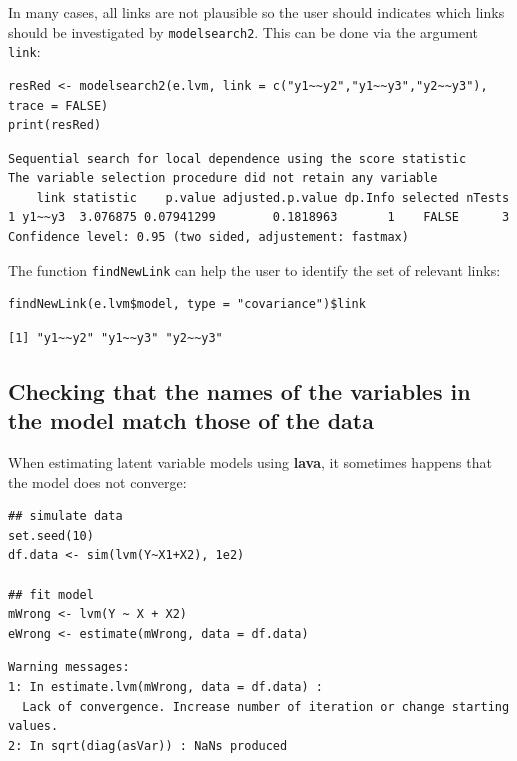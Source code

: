 \documentclass[12pt]{article}
\begin{document}
In many cases, all links are not plausible so the user should
indicates which links should be investigated by \texttt{modelsearch2}. This
can be done via the argument \texttt{link}:

\lstset{language=r,label= ,caption= ,captionpos=b,numbers=none}
\begin{lstlisting}
resRed <- modelsearch2(e.lvm, link = c("y1~~y2","y1~~y3","y2~~y3"), trace = FALSE)
print(resRed)
\end{lstlisting}

\begin{verbatim}
Sequential search for local dependence using the score statistic 
The variable selection procedure did not retain any variable 
    link statistic    p.value adjusted.p.value dp.Info selected nTests
1 y1~~y3  3.076875 0.07941299        0.1818963       1    FALSE      3
Confidence level: 0.95 (two sided, adjustement: fastmax)
\end{verbatim}


The function \texttt{findNewLink} can help the user to identify the set of
relevant links:
\lstset{language=r,label= ,caption= ,captionpos=b,numbers=none}
\begin{lstlisting}
findNewLink(e.lvm$model, type = "covariance")$link
\end{lstlisting}

\begin{verbatim}
[1] "y1~~y2" "y1~~y3" "y2~~y3"
\end{verbatim}

\subsection{Checking that the names of the variables in the model match those of the data}
\label{sec:org47cf06d}

When estimating latent variable models using \textbf{lava}, it sometimes
happens that the model does not converge:
\lstset{language=r,label= ,caption= ,captionpos=b,numbers=none}
\begin{lstlisting}
## simulate data
set.seed(10)
df.data <- sim(lvm(Y~X1+X2), 1e2)

## fit model
mWrong <- lvm(Y ~ X + X2)
eWrong <- estimate(mWrong, data = df.data)
\end{lstlisting}

\begin{verbatim}
Warning messages:
1: In estimate.lvm(mWrong, data = df.data) :
  Lack of convergence. Increase number of iteration or change starting values.
2: In sqrt(diag(asVar)) : NaNs produced
\end{verbatim}
\end{document}

